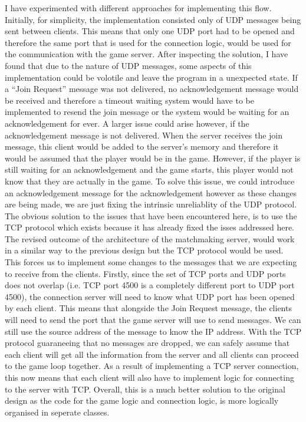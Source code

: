 I have experimented with different approaches for implementing this flow. Initially, for simplicity, the implementation consisted only of UDP messages being sent between clients. This means that only one UDP port had to be opened and therefore the same port that is used for the connection logic, would be used for the communication with the game server. After inspecting the solution, I have found that due to the nature of UDP messages, some aspects of this implementation could be volotile and leave the program in a unexpected state. If a ``Join Request'' message was not delivered, no acknowledgement message would be received and therefore a timeout waiting system would have to be implemented to resend the join message or the system would be waiting for an acknowledgement for ever. A larger issue could arise however, if the acknowledgement message is not delivered. When the server receives the join message, this client would be added to the server's memory and therefore it would be assumed that the player would be in the game. However, if the player is still waiting for an acknowledgement and the game starts, this player would not know that they are actually in the game. To solve this issue, we could introduce an acknowledgement message for the acknowledgement however as these changes are being made, we are just fixing the intrinsic unreliablity of the UDP protocol.
The obvious solution to the issues that have been encountered here, is to use the TCP protocol which exists because it has already fixed the isses addressed here.
The revised outcome of the architecture of the matchmaking server, would work in a similar way to the previous design but the TCP protocol would be used. This forces us to implement some changes to the messages that we are expecting to receive from the clients. Firstly, since the set of TCP ports and UDP ports does not overlap (i.e. TCP port 4500 is a completely different port to UDP port 4500), the connection server will need to know what UDP port has been opened by each client. This means that alongside the Join Request message, the clients will need to send the port that the game server will use to send messages. We can still use the source address of the message to know the IP address. With the TCP protocol guaraneeing that no messages are dropped, we can safely assume that each client will get all the information from the server and all clients can proceed to the game loop together. As a result of implementing a TCP server connection, this now means that each client will also have to implement logic for connecting to the server with TCP.
Overall, this is a much better solution to the original design as the code for the game logic and connection logic, is more logically organised in seperate classes.


